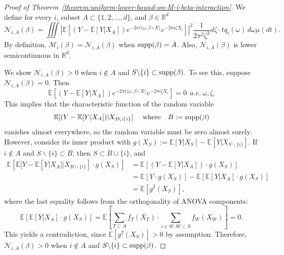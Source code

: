 \documentclass[sn-mathphys-num]{sn-jnl}%
\numberwithin{equation}{section}
\newcommand{\R}{\mathbb{R}}
\newcommand{\E}{\mathbb{E}}
\newcommand{\supp}{\mathop{\rm supp}}
\theoremstyle{thmstyleone}%
\theoremstyle{thmstyletwo}%
\theoremstyle{thmstylethree}%
\begin{document}
\begin{proof}[Proof of Theorem~\ref{theorem:uniform-lower-bound-on-M-i-beta-interaction}]
 We define 
for every $i$, subset $A \subset \{1, 2, \ldots, d\}$, and $\beta \in \R^d$
\begin{equation*}
	 \mathcal{N}_{i, A}(\beta) = \iiint \left|\E[(Y-\E[Y|X_A]) e^{-2\pi i \langle \omega, \beta\circ X \rangle} e^{-2\pi i \zeta X_i}] \right|^2 \frac{1}{2\pi^2 \zeta^2} d\zeta \cdot t q_t(\omega) \, d\omega  \mu(dt).
\end{equation*} 
By definition, $\mathcal{M}_i(\beta)  = \mathcal{N}_{i, A}(\beta)$ when $\supp(\beta) = A$. Also, 
 $\mathcal{N}_{i, A}(\beta)$ is lower semicontinuous in $\R^d$. 

We show $\mathcal{N}_{i, A}(\beta)  > 0$ when $i \not \in A$ and $S \backslash \{i\} \subset \supp(\beta)$. To see this, 
suppose $ \mathcal{N}_{i, A}(\beta) = 0$. Then 
\begin{equation*}
	\mathbb{E}[(Y-\E[Y|X_A]) e^{-2\pi i \langle \omega, \beta \circ X \rangle}  e^{-2\pi i \zeta X_i}] = 0~~a.e.~\omega, \zeta.
\end{equation*}
This implies that the characteristic function of the random variable
\begin{equation*}
	\E[(Y-\E[Y|X_A])|X_{B \cup \{i\}}]~~~~\text{where}~~~B:=\supp(\beta)
\end{equation*} 
vanishes almost everywhere, so the random variable must be zero almost surely. However, consider its
inner product with $g(X_S):= \E[Y|X_S] - \E[Y|X_{S \backslash \{i\}}]$. If $i \not\in A$ and $S \backslash \{i\} \subset B$, then 
$S \subset B \cup \{i\}$, and 
\begin{equation*}
\begin{split}
\mathbb{E}\left[\mathbb{E}[Y - \mathbb{E}[Y | X_A] | X_{B \cup \{i\}}] \cdot g(X_S)\right]
&= \mathbb{E}[(Y - \mathbb{E}[Y | X_A]) \cdot g(X_S)] \\
&= \mathbb{E}[Y \cdot g(X_S)] - \mathbb{E}[\mathbb{E}[Y| X_A] \cdot g(X_S)] \\
&= \mathbb{E}[g^2(X_S)],
\end{split}
\end{equation*}
where the last equality follows from the orthogonality of ANOVA components: 
\begin{equation*}
	\mathbb{E}[\mathbb{E}[Y| X_A] \cdot g(X_S)]
		= \mathbb{E} [\sum_{T \subset A} f_{T}(X_T) \cdot \sum_{i \in W, W \subset S} f_W(X_W)] = 0.
\end{equation*}
This yields a contradiction, since $\mathbb{E}[g^2(X_S)] > 0$ by assumption. Therefore, $\mathcal{N}_{i, A}(\beta) > 0$ when $i \not \in A$ and $S \backslash \{i\} \subset \supp(\beta)$.



\end{proof}
\end{document}
